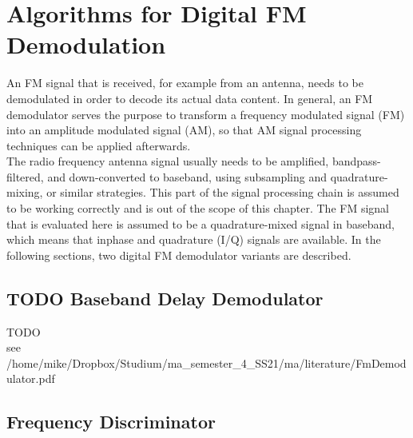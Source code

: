 \section{Algorithms for Digital FM Demodulation}
\label{sec:algorithms-for-digital-fm-demodulation}

An FM signal that is received, for example from an antenna, needs to be demodulated in order to decode its actual data content.
In general, an FM demodulator serves the purpose to transform a frequency modulated signal (FM) into an amplitude modulated signal (AM), so that AM signal processing techniques can be applied afterwards.\\

The radio frequency antenna signal usually needs to be amplified, bandpass-filtered, and down-converted to baseband, using subsampling and quadrature-mixing, or similar strategies.
This part of the signal processing chain is assumed to be working correctly and is out of the scope of this chapter. %
The FM signal that is evaluated here is assumed to be a quadrature-mixed signal in baseband, which means that inphase and quadrature (I/Q) signals are available.
%
%
In the following sections, two digital FM demodulator variants are described.


\subsection{TODO Baseband Delay Demodulator}
\label{sec:BasebandDelayDemodulator}
TODO\\
see /home/mike/Dropbox/Studium/ma\_semester\_4\_SS21/ma/literature/FmDemodulator.pdf

\subsection{Frequency Discriminator}

